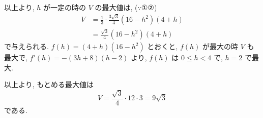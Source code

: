 \documentclass[../main.tex]{subfiles}
\begin{document}
以上より, $h$ が一定の時の $V$ の最大値は, ($\because \text{①②}$)
\begin{align*}
  V &= \frac{1}{3} \cdot \frac{3\sqrt{3}}{4} (16-h^2) (4+h) \\
  &= \frac{\sqrt{3}}{4} (16-h^2) (4+h)
\end{align*}
で与えられる. $f(h) = (4+h)(16-h^2)$ とおくと, $f(h)$ が最大の時 $V$ も最大で, $f'(h) = -(3h+8)(h-2)$ より, $f(h)$ は $0 \le h < 4$ で, $h=2$ で最大.

以上より, もとめる最大値は
\[
  V = \frac{\sqrt{3}}{4} \cdot 12 \cdot 3 = 9\sqrt{3}
\]
である.
\end{document}
